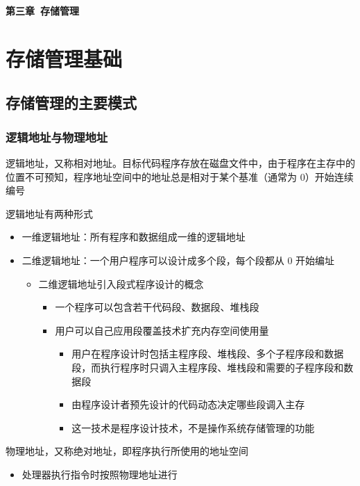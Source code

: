 \documentclass[cs4size,a4paper,10pt]{ctexart}
\begin{document}
	\begin{center}
		{\huge\textbf{第三章\ 存储管理}}
	\end{center}
	\tableofcontents
	\clearpage

	\setcounter{page}{1}
	\setlength{\parskip}{0.65em}
	
	\section{存储管理基础}
	\subsection{存储管理的主要模式}
	\subsubsection{逻辑地址与物理地址}
	逻辑地址，又称相对地址。目标代码程序存放在磁盘文件中，由于程序在主存中的位置不可预知，程序地址空间中的地址总是相对于某个基准（通常为 0）开始连续编号

	逻辑地址有两种形式
	\begin{itemize}
		\item 一维逻辑地址：所有程序和数据组成一维的逻辑地址
		\item 二维逻辑地址：一个用户程序可以设计成多个段，每个段都从 0 开始编址
		\begin{itemize}
			\item 二维逻辑地址引入段式程序设计的概念
			\begin{itemize}
				\item 一个程序可以包含若干代码段、数据段、堆栈段
				\item 用户可以自己应用段覆盖技术扩充内存空间使用量
				\begin{itemize}
					\item 用户在程序设计时包括主程序段、堆栈段、多个子程序段和数据段，而执行程序时只调入主程序段、堆栈段和需要的子程序段和数据段
					\item 由程序设计者预先设计的代码动态决定哪些段调入主存
					\item 这一技术是程序设计技术，不是操作系统存储管理的功能
				\end{itemize}
			\end{itemize}
		\end{itemize}
	\end{itemize}
	
	物理地址，又称绝对地址，即程序执行所使用的地址空间
	\begin{itemize}
		\item 处理器执行指令时按照物理地址进行
	\end{itemize}
\end{document}
